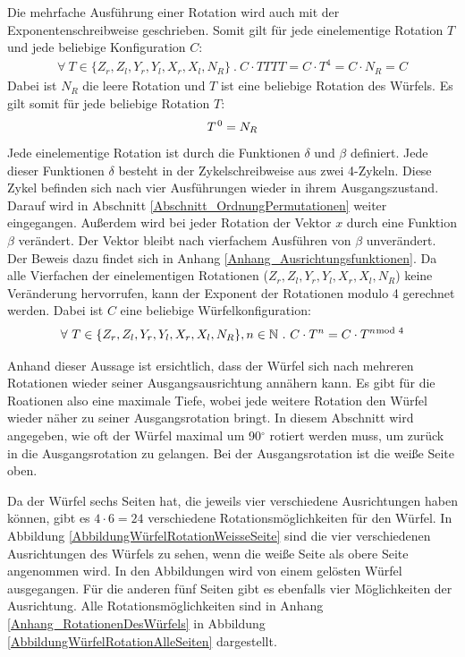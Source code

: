 \documentclass[12pt,a4paper, usenames, dvipsnames]{article}
\theoremstyle{mystyle}
\theoremstyle{definition}
\begin{document}
Die mehrfache Ausführung einer Rotation wird auch mit der Exponentenschreibweise geschrieben. 
Somit gilt für jede einelementige Rotation $T$ und jede beliebige Konfiguration $C$: 
\begin{align*}
\forall \ T \in \{{Z_r}, {Z_l}, {Y_r}, {Y_l}, {X_r}, {X_l} , N_R \} \ . \  C \cdot TTTT= C \cdot T^4=C \cdot N_R = C 
\end{align*} 
Dabei ist $N_R$ die leere Rotation und $T$ ist eine beliebige Rotation des Würfels. Es gilt somit für jede beliebige Rotation $T$:
\begin{align*}
T^{\hspace*{0.1em}0}=N_R
\end{align*}
Jede einelementige Rotation ist durch die Funktionen $\delta$ und $\beta$ definiert. Jede dieser Funktionen $\delta$ besteht in der Zykelschreibweise aus zwei 4-Zykeln. Diese Zykel befinden sich nach vier Ausführungen wieder in ihrem Ausgangszustand. Darauf wird in Abschnitt \ref{Abschnitt_OrdnungPermutationen} weiter eingegangen. Außerdem wird bei jeder Rotation der Vektor $x$ durch eine Funk\-tion $\beta$ verändert. Der Vektor bleibt nach vierfachem Ausführen von $\beta$ unverändert. Der Beweis dazu findet sich in Anhang \ref{Anhang_Ausrichtungsfunktionen}.
Da alle Vierfachen der einelementigen Rotationen (${Z_r}, {Z_l}, {Y_r}, {Y_l}, {X_r}, {X_l} , N_R$) keine Veränderung hervorrufen, kann der Exponent der Rotationen modulo 4 gerechnet werden. Dabei ist $C$ eine beliebige Würfelkonfiguration:
\begin{align*}
\forall \ T \in \{{Z_r}, {Z_l}, {Y_r}, {Y_l}, {X_r}, {X_l}, N_R \}, n \in \mathbb{N} \ . \ C \cdot T^n=C \cdot T^{n \hspace*{-0.5em} \mod 4}
\end{align*}

Anhand dieser Aussage ist ersichtlich, dass der Würfel sich nach mehreren Rotationen wieder seiner Ausgangsausrichtung annähern kann. Es gibt für die Roationen also eine maximale Tiefe, wobei jede weitere Rotation den Würfel wieder näher zu seiner Ausgangsrotation bringt.
In diesem Abschnitt wird angegeben, wie oft der Würfel maximal um 90$^\circ$ rotiert werden muss, um zurück in die Ausgangsrotation zu gelangen. Bei der Ausgangsrotation ist die weiße Seite oben.

Da der Würfel sechs Seiten hat, die jeweils vier verschiedene Ausrichtungen haben können, gibt es $4 \cdot 6 = 24$ verschiedene Rotationsmöglichkeiten für den Würfel. In Abbildung \ref{AbbildungWürfelRotationWeisseSeite} sind die vier verschiedenen Ausrichtungen des Würfels zu sehen, wenn die weiße Seite als obere Seite angenommen wird. In den Abbildungen wird von einem gelösten Würfel ausgegangen. Für die anderen fünf Seiten gibt es ebenfalls vier Möglichkeiten der Ausrichtung. Alle Rotationsmöglichkeiten sind in Anhang \ref{Anhang_RotationenDesWürfels} in Abbildung \ref{AbbildungWürfelRotationAlleSeiten} dargestellt.
\end{document}
